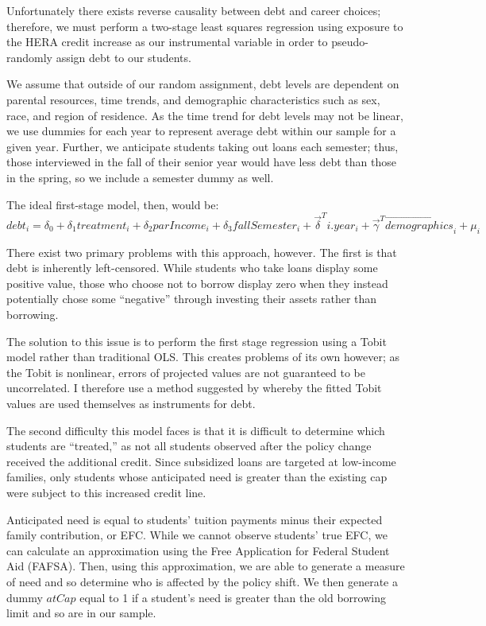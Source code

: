 \documentclass{article}
\begin{document}
	Unfortunately there exists reverse causality between debt and career choices; therefore, we must perform a two-stage least squares regression using exposure to the HERA credit increase as our instrumental variable in order to pseudo-randomly assign debt to our students. 
	
	We assume that outside of our random assignment, debt levels are dependent on parental resources, time trends, and demographic characteristics such as sex, race, and region of residence. As the time trend for debt levels may not be linear, we use dummies for each year to represent average debt within our sample for a given year. Further, we anticipate students taking out loans each semester; thus, those interviewed in the fall of their senior year would have less debt than those in the spring, so we include a semester dummy as well.
	
	The ideal first-stage model, then, would be: $$debt_i = \delta_0 + \delta_1 treatment_i + \delta_2 parIncome_i + \delta_3 fallSemester_i + \vec{\delta}^T i.year_i + \vec{\gamma}^T \vec{demographics}_i + \mu_i$$
	
	There exist two primary problems with this approach, however. The first is that debt is inherently left-censored. While students who take loans display some positive value, those who choose not to borrow display zero when they instead potentially chose some ``negative'' through investing their assets rather than borrowing. 
	
	The solution to this issue is to perform the first stage regression using a Tobit model rather than traditional OLS. This creates problems of its own however; as the Tobit is nonlinear, errors of projected values are not guaranteed to be uncorrelated. I therefore use a method suggested by \textcite{angrist2009} whereby the fitted Tobit values are used themselves as instruments for debt. 
	
	The second difficulty this model faces is that it is difficult to determine which students are ``treated,'' as not all students observed after the policy change received the additional credit. Since subsidized loans are targeted at low-income families, only students whose anticipated need is greater than the existing cap were subject to this increased credit line. 
	
	Anticipated need is equal to students' tuition payments minus their expected family contribution, or EFC. While we cannot observe students' true EFC, we can calculate an approximation using the Free Application for Federal Student Aid (FAFSA). Then, using this approximation, we are able to generate a measure of need and so determine who is affected by the policy shift. We then generate a dummy $atCap$ equal to 1 if a student's need is greater than the old borrowing limit and so are in our sample. 
	
\end{document}

